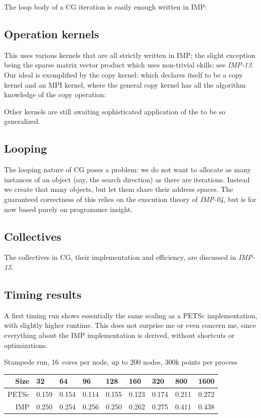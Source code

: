 \documentclass[11pt,fleqn,preprint]{impreport}
\begin{document}
The loop body of a CG iteration is easily enough written in IMP:
%

\subsection{Operation kernels}

This uses various kernels that are all strictly written in IMP; the slight exception
being the sparse matrix vector product which uses non-trivial skills; see \emph{IMP-13}.
Our ideal is exemplified by the copy kernel:
%
%
which declares itself to be a copy kernel and an MPI kernel, where the general
copy kernel has all the algorithm knowledge of the copy operation:
%

Other kernels are still awaiting sophisticated application of the 
to be so generalized.

\subsection{Looping}

The looping nature of CG poses a problem: we do not want to allocate as many
instances of an object (say, the search direction) as there are iterations.
Instead we create that many objects, but let them share their address spaces.
The guaranteed correctness of this relies on the execution theory of \emph{IMP-04},
but is for now based purely on programmer insight.

\subsection{Collectives}

The collectives in CG, their implementation and efficiency, are discussed in \emph{IMP-15}.

\subsection{Timing results}

A first timing run shows essentially the same scaling as a PETSc\cite{GrSm:petsc} implementation,
with slightly higher runtime. This does not surprise me or even concern me, since
everything about the IMP implementation is derived, without shortcuts or optimizations.

%
Stampede run, 16~cores per node, up to 200 nodes, 300k points per process
\begin{tabular}{|r|llllllll|}
  \hline
  Size&
  32&64&96&128&160&320&800&1600\\
  \hline
  PETSc&
  0.159&
  0.154&
  0.114&
  0.155&
  0.123&
  0.174&
  0.211&
  0.272\\
  IMP&
  0.250&
  0.254&
  0.256&
  0.250&
  0.262&
  0.275&
  0.411&
  0.438\\
  \hline
\end{tabular}
\end{document}
